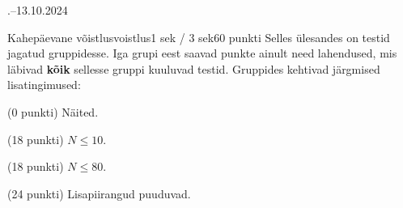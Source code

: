 \documentclass[a4paper,11pt]{article}
\begin{document}
\begin{ol}{\eio}{.--13.10.2024}{\yle}{}
\begin{yl}{4}{Kahepäevane võistlus}{voistlus}{1 sek / 3 sek}{60 punkti}
    \hnd Selles ülesandes on testid jagatud gruppidesse. Iga grupi eest saavad punkte
    ainult need lahendused, mis läbivad \textbf{kõik} sellesse gruppi kuuluvad
    testid. Gruppides kehtivad järgmised lisatingimused:

    \begin{minipage}[t]{0.45\textwidth}
      \begin{xenum}
        \item (0 punkti) Näited.
        \item (18 punkti) $N \le 10$.
      \end{xenum}
    \end{minipage}
    \begin{minipage}[t]{0.45\textwidth}
      \begin{xenum} \setcounter{enumi}{2}
        \item (18 punkti) $N \le 80$.
        \item (24 punkti) Lisapiirangud puuduvad.
      \end{xenum}
    \end{minipage}
  \end{yl}
\end{ol}
\end{document}
